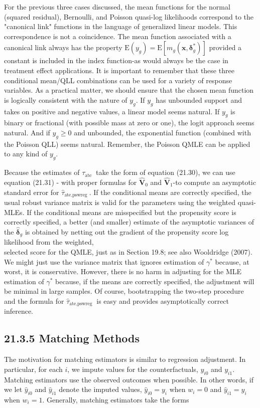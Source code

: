 \documentclass[10pt]{article}
\begin{document}
For the previous three cases discussed, the mean functions for the normal (squared residual), Bernoulli, and Poisson quasi-log likelihoods correspond to the "canonical link" functions in the language of generalized linear models. This correspondence is not a coincidence. The mean function associated with a canonical link always has the property $\mathrm{E}\left(y_{g}\right)=\mathrm{E}\left[m_{g}\left(\mathbf{x}, \boldsymbol{\delta}_{g}^{*}\right)\right]$ provided a constant is included in the index function-as would always be the case in treatment effect applications. It is important to remember that these three conditional mean/QLL combinations can be used for a variety of response variables. As a practical matter, we should ensure that the chosen mean function is logically consistent with the nature of $y_{g}$. If $y_{g}$ has unbounded support and takes on positive and negative values, a linear model seems natural. If $y_{g}$ is binary or fractional (with possible mass at zero or one), the logit approach seems natural. And if $y_{g} \geq 0$ and unbounded, the exponential function (combined with the Poisson QLL) seems natural. Remember, the Poisson QMLE can be applied to any kind of $y_{g}$.

Because the estimates of $\tau_{\text {ate }}$ take the form of equation (21.30), we can use equation (21.31) - with proper formulas for $\hat{\mathbf{V}}_{0}$ and $\hat{\mathbf{V}}_{1}$-to compute an asymptotic standard error for $\hat{\tau}_{\text {ate,pswreg }}$. If the conditional means are correctly specified, the usual robust variance matrix is valid for the parameters using the weighted quasi-MLEs. If the conditional means are misspecified but the propensity score is correctly specified, a better (and smaller) estimate of the asymptotic variances of the $\hat{\boldsymbol{\delta}}_{g}$ is obtained by netting out the gradient of the propensity score log likelihood from the weighted,\\
selected score for the QMLE, just as in Section 19.8; see also Wooldridge (2007). We might just use the variance matrix that ignores estimation of $\gamma^{*}$ because, at worst, it is conservative. However, there is no harm in adjusting for the MLE estimation of $\gamma^{*}$ because, if the means are correctly specified, the adjustment will be minimal in large samples. Of course, bootstrapping the two-step procedure and the formula for $\hat{\tau}_{\text {ate,pswreg }}$ is easy and provides asymptotically correct inference.

\subsection*{21.3.5 Matching Methods}
The motivation for matching estimators is similar to regression adjustment. In particular, for each $i$, we impute values for the counterfactuals, $y_{i 0}$ and $y_{i 1}$. Matching estimators use the observed outcomes when possible. In other words, if we let $\hat{y}_{i 0}$ and $\hat{y}_{i 1}$ denote the imputed values, $\hat{y}_{i 0}=y_{i}$ when $w_{i}=0$ and $\hat{y}_{i 1}=y_{i}$ when $w_{i}=1$. Generally, matching estimators take the forms
\end{document}
